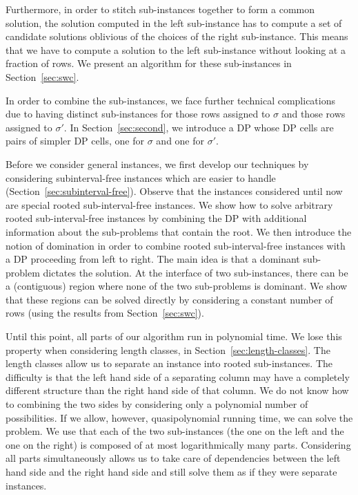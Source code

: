 Furthermore, in order to stitch sub-instances together to form a common solution, the solution computed in the left sub-instance has to compute a set of candidate solutions oblivious of the choices of the right sub-instance.
This means that we have to compute a solution to the left sub-instance without looking at a fraction of rows.
We present an algorithm for these sub-instances in Section~\ref{sec:swc}.

In order to combine the sub-instances, we face further technical complications due to having distinct sub-instances for those rows assigned to $\sigma$ and those rows assigned to $\sigma'$.
In Section~\ref{sec:second}, we introduce a DP whose DP cells are pairs of simpler DP cells, one for $\sigma$ and one for $\sigma'$.

Before we consider general instances, we first develop our techniques by considering subinterval-free instances which are easier to handle (Section~\ref{sec:subinterval-free}).
Observe that the instances considered until now are special rooted sub-interval-free instances.
We show how to solve arbitrary rooted sub-interval-free instances by combining the DP with additional information about the sub-problems that contain the root.
We then introduce the notion of domination in order to combine rooted sub-interval-free instances with a DP proceeding from left to right.
The main idea is that a dominant sub-problem dictates the solution.
At the interface of two sub-instances, there can be a (contiguous) region where none of the two sub-problems is dominant.
We show that these regions can be solved directly by considering a constant number of rows (using the results from Section~\ref{sec:swc}).

Until this point, all parts of our algorithm run in polynomial time.
We lose this property when considering length classes, in Section~\ref{sec:length-classes}.
The length classes allow us to separate an instance into rooted sub-instances.
The difficulty is that the left hand side of a separating column may have a completely different structure than the right hand side of that column.
We do not know how to combining the two sides by considering only a polynomial number of possibilities.
If we allow, however, quasipolynomial running time, we can solve the problem. 
We use that each of the two sub-instances (the one on the left and the one on the right) is composed of at most logarithmically many parts.
Considering all parts simultaneously allows us to take care of dependencies between the left hand side and the right hand side and still solve them as if they were separate instances.

